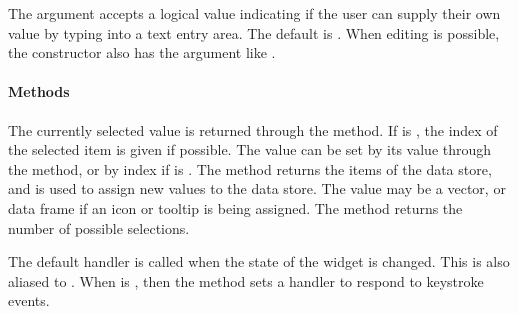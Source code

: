 The argument  accepts a logical value
indicating if the user can supply their own value by typing into a
text entry area. The default is . When editing is
possible, the constructor also has the
 argument like .

\paragraph{Methods}
The currently selected value is returned through the
 method. If  is , the
index of the selected item is given if possible. The value can be set
by its value through the  method, or
by index if  is . The \method{[}{gcombobox}
method returns the items of the data store, and
\method{[\ASSIGN}{gcombobox} is used to assign new values to the data
store. The value may be a vector, or data frame if an icon or tooltip
is being assigned. The  method returns the
number of possible selections.

The default handler is called when the state of the widget is
changed. This is also aliased to
. When  is
, then the  method
sets a handler to respond to keystroke events.

